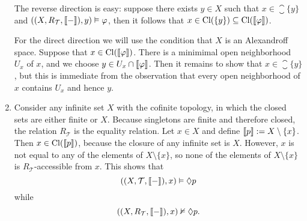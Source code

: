 \documentclass{article}
\newcommand{\topology}{{\mathcal{T}}}
\begin{document}
\begin{ex}
\begin{enumerate}
The reverse direction is easy: suppose there exists $y\in X$ such that
$x\in\closure{\{y\}}$ and $((X,R_\topology,\lsem{-}\rsem),y)\models\varphi$,
then it follows that $x\in\mathrm{Cl}(\{y\})\subseteq\mathrm{Cl}(\llbracket\varphi\rrbracket)$.

For the direct direction we will use the condition that $X$ is an Alexandroff
space. Suppose that $x\in\mathrm{Cl}(\llbracket\varphi\rrbracket)$. There is a minimimal
open neighborhood $U_x$ of $x$, and we choose $y\in U_x\cap\llbracket\varphi\rrbracket$.
Then it remains to show that $x\in\closure{\{y\}}$, but this is immediate from
the observation that every open neighborhood of $x$ contains $U_x$ and hence $y$.
\item Consider any infinite set $X$ with the cofinite topology, in which the closed
sets are either finite or $X$. Because singletons are finite and therefore
closed, the relation $R_\topology$ is the equality relation.
Let $x\in X$ and define $\llbracket p\rrbracket:=X\setminus\{x\}$. Then $x\in\mathrm{Cl}(\llbracket p\rrbracket)$,
because the closure of any infinite set is $X$. However, $x$ is not equal to any
of the elements of $X\setminus\{x\}$, so none of the elements of $X\setminus\{x\}$
is $R_\topology$-accessible from $x$. This shows that
\begin{equation*}
((X,\topology,\lsem{-}\rsem),x)\models \pos p
\end{equation*}
while
\begin{equation*}
((X,R_\topology,\lsem{-}\rsem),x)\nmodels \pos p.
\end{equation*}
\end{enumerate}
\end{ex}
\end{document}
